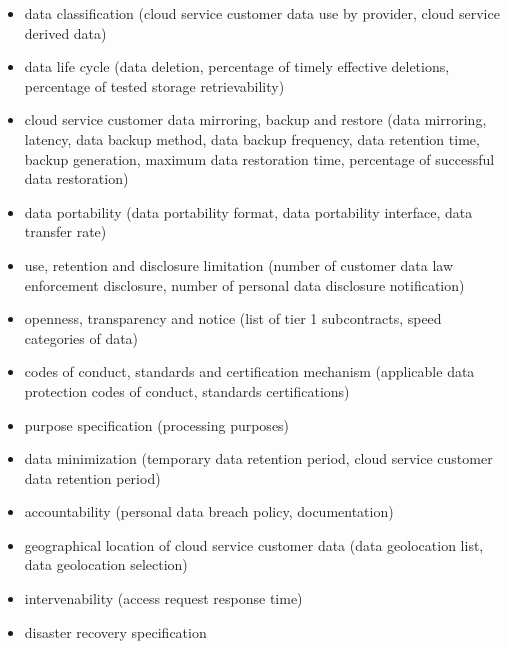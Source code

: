 \documentclass[12pt,a4paper,oneside]{report}
\begin{document}
\begin{itemize}
\item data classification (cloud service customer data use by provider, cloud service derived data)
\item data life cycle (data deletion, percentage of timely effective deletions, percentage of tested storage retrievability)
\item cloud service customer data mirroring, backup and restore (data mirroring, latency, data backup method, data backup frequency, data retention time, backup generation, maximum data restoration time, percentage of successful data restoration)
\item data portability (data portability format, data portability interface, data transfer rate)
\item use, retention and disclosure limitation (number of customer data law enforcement disclosure, number of personal data disclosure notification) 
\item openness, transparency and notice (list of tier 1 subcontracts, speed categories of data)
\item codes of conduct, standards and certification mechanism (applicable data protection codes of conduct, standards certifications)
\item purpose specification (processing purposes)
\item data minimization (temporary data retention period, cloud service customer data retention period)
\item accountability (personal data breach policy, documentation)
\item geographical location of cloud service customer data (data geolocation list, data geolocation selection)
\item intervenability (access request response time)
\item disaster recovery specification
\end{itemize}
\end{document}
